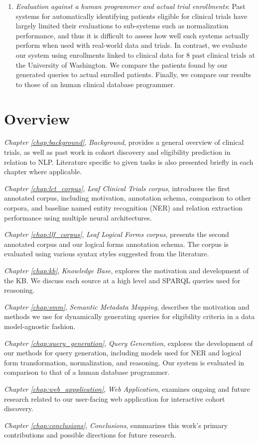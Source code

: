 \documentclass[../main.tex]{subfiles}
\begin{document}
\begin{enumerate}
    \item \textit{Evaluation against a human programmer and actual trial enrollments}: Past systems for automatically identifying patients eligible for clinical trials have largely limited their evaluations to sub-systems such as normalization performance, and thus it is difficult to assess how well such systems actually perform when used with real-world data and trials. In contrast, we evaluate our system using enrollments linked to clinical data for 8 past clinical trials at the University of Washington. We compare the patients found by our generated queries to actual enrolled patients. Finally, we compare our results to those of an human clinical database programmer.
\end{enumerate}

\section{Overview}

\textit{Chapter \ref{chap:background}}, \textit{Background}, provides a general overview of clinical trials, as well as past work in cohort discovery and eligibility prediction in relation to NLP. Literature specific to given tasks is also presented briefly in each chapter where applicable. 

\textit{Chapter \ref{chap:lct_corpus}}, \textit{Leaf Clinical Trials corpus}, introduces the first annotated corpus, including motivation, annotation schema, comparison to other corpora, and baseline named entity recognition (NER) and relation extraction performance using multiple neural architectures.

\textit{Chapter \ref{chap:llf_corpus}}, \textit{Leaf Logical Forms corpus}, presents the second annotated corpus and our logical forms annotation schema. The corpus is evaluated using various syntax styles suggested from the literature.

\textit{Chapter \ref{chap:kb}}, \textit{Knowledge Base}, explores the motivation and development of the KB. We discuss each source at a high level and SPARQL queries used for reasoning.

\textit{Chapter \ref{chap:smm}}, \textit{Semantic Metadata Mapping}, describes the motivation and methods we use for dynamically generating queries for eligibility criteria in a data model-agnostic fashion.

\textit{Chapter \ref{chap:query_generation}}, \textit{Query Generation}, explores the development of our methods for query generation, including models used for NER and logical form transformation, normalization, and reasoning. Our system is evaluated in comparison to that of a human database programmer.

\textit{Chapter \ref{chap:web_appplication}}, \textit{Web Application}, examines ongoing and future research related to our user-facing web application for interactive cohort discovery.

\textit{Chapter \ref{chap:conclusions}}, \textit{Conclusions}, summarizes this work's primary contributions and possible directions for future research.
\end{document}
